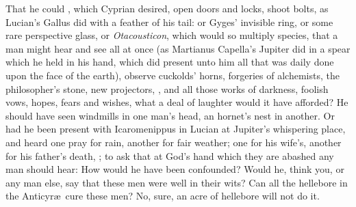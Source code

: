 {That he could , which Cyprian desired, open doors and locks, shoot
bolts, as Lucian's Gallus did with a feather of his tail: or Gyges'
invisible ring, or some rare perspective glass, or \emph{Otacousticon},
which would so multiply species, that a man might hear and see all at
once (as  Martianus Capella's Jupiter did in a spear which he held
in his hand, which did present unto him all that was daily done upon
the face of the earth), observe cuckolds' horns, forgeries of
alchemists, the philosopher's stone, new projectors, \etc{}, and all those
works of darkness, foolish vows, hopes, fears and wishes, what a deal
of laughter would it have afforded? He should have seen windmills in
one man's head, an hornet's nest in another. Or had he been present
with Icaromenippus in Lucian at Jupiter's whispering place, and
heard one pray for rain, another for fair weather; one for his wife's,
another for his father's death, \etc{}; to ask that at God's hand which
they are abashed any man should hear: How would he have been
confounded? Would he, think you, or any man else, say that these men
were well in their wits?  Can all the hellebore in the Anticyr\ae{}\ cure these men? No,
sure, an acre of hellebore will not do it.

}
